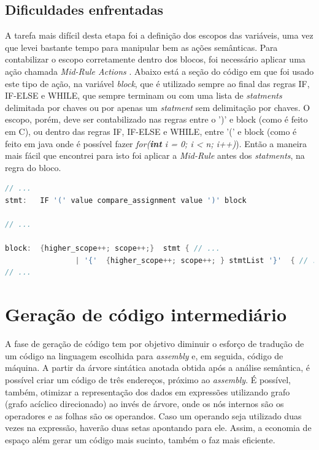 \documentclass[12pt]{article}
\begin{document}
\subsection{Dificuldades enfrentadas}

\indent A tarefa mais difícil desta etapa foi a definição dos escopos das variáveis, uma vez que levei bastante tempo para manipular bem as ações semânticas. Para contabilizar o escopo corretamente dentro dos blocos, foi necessário aplicar uma ação chamada \textit{Mid-Rule Actions} \cite{gnuMidRule}. Abaixo está a seção do código em que foi usado este tipo de ação, na variável \textit{block}, que é utilizado sempre ao final das regras IF, IF-ELSE e WHILE, que sempre terminam ou com uma lista de \textit{statments} delimitada por chaves ou por apenas um \textit{statment} sem delimitação por chaves. O escopo, porém, deve ser contabilizado nas regras entre o ')' e block (como é feito em C), ou dentro das regras IF, IF-ELSE e WHILE, entre '(' e block (como é feito em java onde é possível fazer \textit{for(\textbf{int} i = 0; i < n; i++)}). Então a maneira mais fácil que encontrei para isto foi aplicar a \textit{Mid-Rule }antes dos \textit{statments}, na regra do bloco.\\

\begin{lstlisting}[language=C]
// ...
stmt:	IF '(' value compare_assignment value ')' block

// ...

block:  {higher_scope++; scope++;}  stmt { // ...
				| '{'  {higher_scope++; scope++; } stmtList '}'  { // ...
// ...
\end{lstlisting}


\section{Geração de código intermediário}


\indent A fase de geração de código tem por objetivo diminuir o esforço de tradução de um código na linguagem escolhida para \textit{assembly} e, em seguida, código de máquina. A partir da árvore sintática anotada obtida após a análise semântica, é possível criar um código de três endereços, próximo ao \textit{assembly}. É possível, também, otimizar a representação dos dados em expressões utilizando grafo (grafo acíclico direcionado) ao invés de árvore, onde os nós internos são os operadores e as folhas são os operandos. Caso um operando seja utilizado duas vezes na expressão, haverão duas setas apontando para ele. Assim, a economia de espaço além gerar um código mais sucinto, também o faz mais eficiente.
\end{document}
